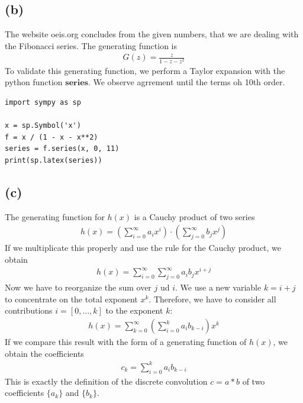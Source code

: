 \documentclass{article}
\begin{document}
\subsection*{(b)}
The website oeis.org concludes from the given numbers, that we are dealing with the Fibonacci series. The generating function is
\begin{align}
G(z) = \frac{z}{1-z-z^2}
\end{align}
To validate this generating function, we perform a Taylor expansion with the python function $\mathbf{series}$. We observe agrrement until the terms oh 10th order.
\begin{verbatim}
import sympy as sp

x = sp.Symbol('x')
f = x / (1 - x - x**2)
series = f.series(x, 0, 11)
print(sp.latex(series))
\end{verbatim}

\subsection*{(c)}
The generating function for $h(x)$ is a Cauchy product of two series
\begin{align}
    h(x) = \left( \sum_{i=0}^{\infty} a_i x^i \right) \cdot \left( \sum_{j=0}^{\infty} b_j x^j \right)
\end{align}
If we multiplicate this properly and use the rule for the Cauchy product, we obtain
\begin{align}
    h(x) = \sum_{i=0}^{\infty} \sum_{j=0}^{\infty} a_i b_j x^{i+j}
\end{align}
Now we have to reorganize the sum over $j$ ud $i$. We use a new variable $k = i + j$ to concentrate on the total exponent $x^k$. Therefore, we have to consider all contributions $i = \left[0,..., k \right]$ to the exponent $k$:
\begin{align}
    h(x) = \sum_{k=0}^{\infty} \left( \sum_{i=0}^{k} a_i b_{k-i} \right) x^k
\end{align}
If we compare this result with the form of a generating function of $h(x)$, we obtain the coefficients
\begin{align}
    c_k = \sum_{i=0}^{k} a_i b_{k-i}
\end{align}
This is exactly the definition of the discrete convolution $c = a * b$ of two coefficients $\{a_k\}$ and $\{b_k\}$.
\end{document}
